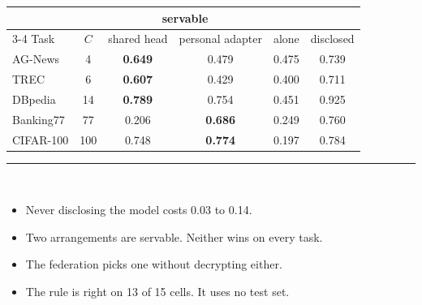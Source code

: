 \documentclass[aspectratio=169,11pt]{beamer}
\newcommand{\redline}{\textcolor{kred}{\rule{\textwidth}{1pt}}}
\begin{document}
\begin{frame}
  \begin{center}
  \footnotesize
  \begin{tabular}{lccccc}
    \toprule
     & & \multicolumn{2}{c}{servable} & & \\
    \cmidrule(lr){3-4}
    Task & $C$ & shared head & personal adapter & alone & disclosed\\
    \midrule
    AG-News   & 4   & \textbf{0.649} & 0.479 & 0.475 & 0.739\\
    TREC      & 6   & \textbf{0.607} & 0.429 & 0.400 & 0.711\\
    DBpedia   & 14  & \textbf{0.789} & 0.754 & 0.451 & 0.925\\
    Banking77 & 77  & 0.206 & \textbf{0.686} & 0.249 & 0.760\\
    CIFAR-100 & 100 & 0.748 & \textbf{0.774} & 0.197 & 0.784\\
    \bottomrule
  \end{tabular}
  \end{center}
  \vspace{0.6em}
  \redline\\[0.6em]
  \begin{itemize}
    \item Never disclosing the model costs 0.03 to 0.14.
    \item Two arrangements are servable. Neither wins on every task.
    \item The federation picks one without decrypting either.
    \item The rule is right on 13 of 15 cells. It uses no test set.
  \end{itemize}
\end{frame}
\end{document}
